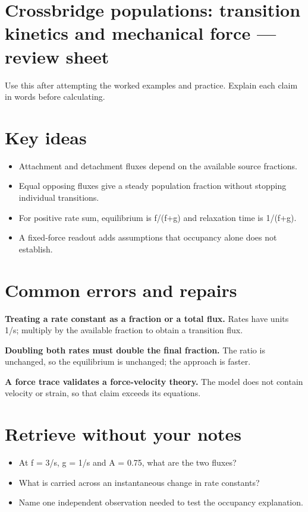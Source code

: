 \documentclass[11pt,letterpaper]{article}
\theoremstyle{definition}\newtheorem{definition}{Definition}\newtheorem{example}{Example}
\numberwithin{equation}{section}
\begin{document}
\section*{Crossbridge populations: transition kinetics and mechanical force --- review sheet}
Use this after attempting the worked examples and practice. Explain each claim in words before calculating.

\section*{Key ideas}
\begin{itemize}
\item Attachment and detachment fluxes depend on the available source fractions.
\item Equal opposing fluxes give a steady population fraction without stopping individual transitions.
\item For positive rate sum, equilibrium is f/(f+\allowbreak{}g) and relaxation time is 1/(f+\allowbreak{}g).
\item A fixed-force readout adds assumptions that occupancy alone does not establish.
\end{itemize}
\section*{Common errors and repairs}
\textbf{Treating a rate constant as a fraction or a total flux.} Rates have units 1/s; multiply by the available fraction to obtain a transition flux.

\textbf{Doubling both rates must double the final fraction.} The ratio is unchanged, so the equilibrium is unchanged; the approach is faster.

\textbf{A force trace validates a force-velocity theory.} The model does not contain velocity or strain, so that claim exceeds its equations.

\section*{Retrieve without your notes}
\begin{itemize}
\item At f =\allowbreak{} 3/s, g =\allowbreak{} 1/s and A =\allowbreak{} 0.75, what are the two fluxes?
\item What is carried across an instantaneous change in rate constants?
\item Name one independent observation needed to test the occupancy explanation.
\end{itemize}
\end{document}
